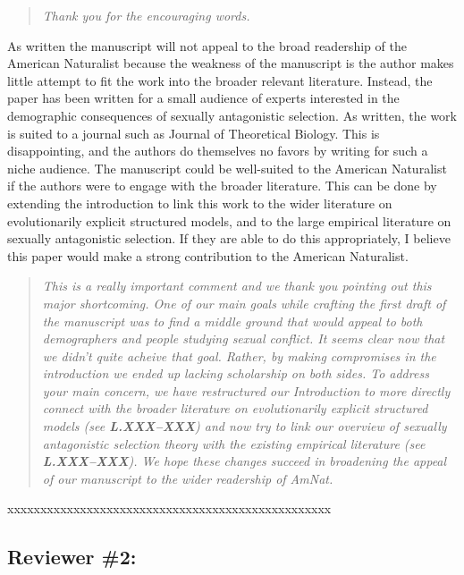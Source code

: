 \documentclass[11pt]{article}
\begin{document}
\begin{quote}
	{\itshape Thank you for the encouraging words.}
\end{quote}

As written the manuscript will not appeal to the broad readership of the American Naturalist because the weakness of the manuscript is the author makes little attempt to fit the work into the broader relevant literature. Instead, the paper has been written for a small audience of experts interested in the demographic consequences of sexually antagonistic selection. As written, the work is suited to a journal such as Journal of Theoretical Biology. This is disappointing, and the authors do themselves no favors by writing for such a niche audience. The manuscript could be well-suited to the American Naturalist if the authors were to engage with the broader literature. This can be done by extending the introduction to link this work to the wider literature on evolutionarily explicit structured models, and to the large empirical literature on sexually antagonistic selection. If they are able to do this appropriately, I believe this paper would make a strong contribution to the American Naturalist.

\begin{quote}
	{\itshape This is a really important comment and we thank you pointing out this major shortcoming. One of our main goals while crafting the first draft of the manuscript was to find a middle ground that would appeal to both demographers and people studying sexual conflict. It seems clear now that we didn't quite acheive that goal. Rather, by making compromises in the introduction we ended up lacking scholarship on both sides. To address your main concern, we have restructured our Introduction to more directly connect with the broader literature on evolutionarily explicit structured models (see {\bf L.XXX--XXX}) and now try to link our overview of sexually antagonistic selection theory with the existing empirical literature (see {\bf L.XXX--XXX}). We hope these changes succeed in broadening the appeal of our manuscript to the wider readership of AmNat.}
\end{quote}

\noindent xxxxxxxxxxxxxxxxxxxxxxxxxxxxxxxxxxxxxxxxxxxxxxxxx


\subsection*{Reviewer \#2:}
\end{document}
